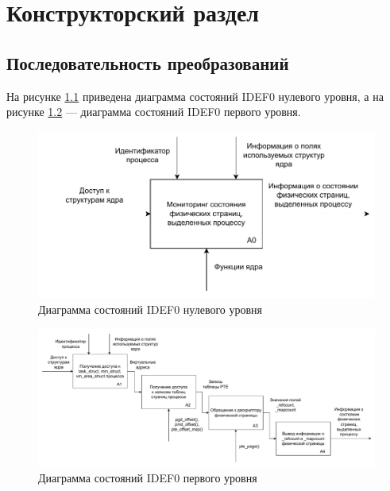 \chapter{Конструкторский раздел}

\section{Последовательность преобразований}

На рисунке \ref{img:idef0} приведена диаграмма состояний IDEF0 нулевого уровня, а на рисунке \ref{img:idef1} --- диаграмма состояний IDEF0 первого уровня.

\begin{figure}[H]
	\begin{center}
		\includegraphics[scale=0.8]{inc/img/idef0.pdf}
	\end{center}
	\captionsetup{justification=centering}
	\caption{Диаграмма состояний IDEF0 нулевого уровня}
	\label{img:idef0}
\end{figure}

\begin{figure}[H]
	\begin{center}
		\includegraphics[scale=0.5]{inc/img/idef1.pdf}
	\end{center}
	\captionsetup{justification=centering}
	\caption{Диаграмма состояний IDEF0 первого уровня}
	\label{img:idef1}
\end{figure}

